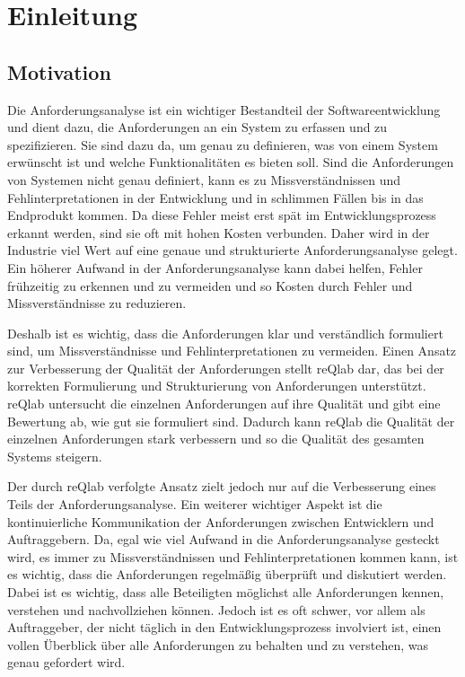 \chapter{Einleitung}

\section{Motivation}

Die Anforderungsanalyse ist ein wichtiger Bestandteil der Softwareentwicklung und dient dazu, die Anforderungen an ein System zu erfassen und zu spezifizieren.
Sie sind dazu da, um genau zu definieren, was von einem System erwünscht ist und welche Funktionalitäten es bieten soll.
Sind die Anforderungen von Systemen nicht genau definiert, kann es zu Missverständnissen und Fehlinterpretationen in der Entwicklung und in schlimmen Fällen bis in das Endprodukt kommen.
Da diese Fehler meist erst spät im Entwicklungsprozess erkannt werden, sind sie oft mit hohen Kosten verbunden.
Daher wird in der Industrie viel Wert auf eine genaue und strukturierte Anforderungsanalyse gelegt.
Ein höherer Aufwand in der Anforderungsanalyse kann dabei helfen, Fehler frühzeitig zu erkennen und zu vermeiden und so Kosten durch Fehler und Missverständnisse zu reduzieren.

Deshalb ist es wichtig, dass die Anforderungen klar und verständlich formuliert sind, um Missverständnisse und Fehlinterpretationen zu vermeiden.
Einen Ansatz zur Verbesserung der Qualität der Anforderungen stellt reQlab dar, das bei der korrekten Formulierung und Strukturierung von Anforderungen unterstützt.
reQlab untersucht die einzelnen Anforderungen auf ihre Qualität und gibt eine Bewertung ab, wie gut sie formuliert sind.
Dadurch kann reQlab die Qualität der einzelnen Anforderungen stark verbessern und so die Qualität des gesamten Systems steigern.

Der durch reQlab verfolgte Ansatz zielt jedoch nur auf die Verbesserung eines Teils der Anforderungsanalyse.
Ein weiterer wichtiger Aspekt ist die kontinuierliche Kommunikation der Anforderungen zwischen Entwicklern und Auftraggebern.
Da, egal wie viel Aufwand in die Anforderungsanalyse gesteckt wird, es immer zu Missverständnissen und Fehlinterpretationen kommen kann, ist es wichtig, dass die Anforderungen regelmäßig überprüft und diskutiert werden.
Dabei ist es wichtig, dass alle Beteiligten möglichst alle Anforderungen kennen, verstehen und nachvollziehen können.
Jedoch ist es oft schwer, vor allem als Auftraggeber, der nicht täglich in den Entwicklungsprozess involviert ist, einen vollen Überblick über alle Anforderungen zu behalten und zu verstehen, was genau gefordert wird.

